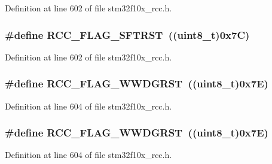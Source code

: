 Definition at line 602 of file stm32f10x\+\_\+rcc.\+h.

\subsubsection[{\texorpdfstring{R\+C\+C\+\_\+\+F\+L\+A\+G\+\_\+\+S\+F\+T\+R\+ST}{RCC_FLAG_SFTRST}}]{\setlength{\rightskip}{0pt plus 5cm}\#define R\+C\+C\+\_\+\+F\+L\+A\+G\+\_\+\+S\+F\+T\+R\+ST~(({\bf uint8\+\_\+t})0x7\+C)}\hypertarget{group___r_c_c___flag_gaf7852615e9b19f0b2dbc8d08c7594b52}{}\label{group___r_c_c___flag_gaf7852615e9b19f0b2dbc8d08c7594b52}


Definition at line 602 of file stm32f10x\+\_\+rcc.\+h.

\subsubsection[{\texorpdfstring{R\+C\+C\+\_\+\+F\+L\+A\+G\+\_\+\+W\+W\+D\+G\+R\+ST}{RCC_FLAG_WWDGRST}}]{\setlength{\rightskip}{0pt plus 5cm}\#define R\+C\+C\+\_\+\+F\+L\+A\+G\+\_\+\+W\+W\+D\+G\+R\+ST~(({\bf uint8\+\_\+t})0x7\+E)}\hypertarget{group___r_c_c___flag_gaa80b60b2d497ccd7b7de1075009999a7}{}\label{group___r_c_c___flag_gaa80b60b2d497ccd7b7de1075009999a7}


Definition at line 604 of file stm32f10x\+\_\+rcc.\+h.

\subsubsection[{\texorpdfstring{R\+C\+C\+\_\+\+F\+L\+A\+G\+\_\+\+W\+W\+D\+G\+R\+ST}{RCC_FLAG_WWDGRST}}]{\setlength{\rightskip}{0pt plus 5cm}\#define R\+C\+C\+\_\+\+F\+L\+A\+G\+\_\+\+W\+W\+D\+G\+R\+ST~(({\bf uint8\+\_\+t})0x7\+E)}\hypertarget{group___r_c_c___flag_gaa80b60b2d497ccd7b7de1075009999a7}{}\label{group___r_c_c___flag_gaa80b60b2d497ccd7b7de1075009999a7}


Definition at line 604 of file stm32f10x\+\_\+rcc.\+h.

